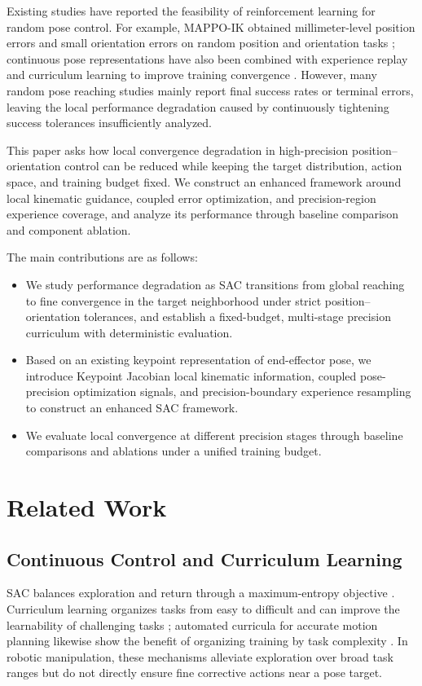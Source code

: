 \documentclass[conference]{IEEEtran}
\begin{document}
Existing studies have reported the feasibility of reinforcement learning for random pose control. For example, MAPPO-IK obtained millimeter-level position errors and small orientation errors on random position and orientation tasks \cite{zhao2024mappoik}; continuous pose representations have also been combined with experience replay and curriculum learning to improve training convergence \cite{hu2025rtpc}. However, many random pose reaching studies mainly report final success rates or terminal errors, leaving the local performance degradation caused by continuously tightening success tolerances insufficiently analyzed.

This paper asks how local convergence degradation in high-precision position--orientation control can be reduced while keeping the target distribution, action space, and training budget fixed. We construct an enhanced framework around local kinematic guidance, coupled error optimization, and precision-region experience coverage, and analyze its performance through baseline comparison and component ablation.

The main contributions are as follows:
\begin{itemize}
  \item We study performance degradation as SAC transitions from global reaching to fine convergence in the target neighborhood under strict position--orientation tolerances, and establish a fixed-budget, multi-stage precision curriculum with deterministic evaluation.
  \item Based on an existing keypoint representation of end-effector pose, we introduce Keypoint Jacobian local kinematic information, coupled pose-precision optimization signals, and precision-boundary experience resampling to construct an enhanced SAC framework.
  \item We evaluate local convergence at different precision stages through baseline comparisons and ablations under a unified training budget.
\end{itemize}

\section{Related Work}
\subsection{Continuous Control and Curriculum Learning}
SAC balances exploration and return through a maximum-entropy objective \cite{haarnoja2018sac}. Curriculum learning organizes tasks from easy to difficult and can improve the learnability of challenging tasks \cite{bengio2009curriculum}; automated curricula for accurate motion planning likewise show the benefit of organizing training by task complexity \cite{cho2025autocurriculum}. In robotic manipulation, these mechanisms alleviate exploration over broad task ranges but do not directly ensure fine corrective actions near a pose target.
\end{document}
